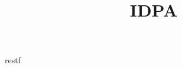 \documentclass[10pt,a4paper]{article}
\title{IDPA}
\begin{document}
 restf
\tableofcontents 


 

 







\end{document}
